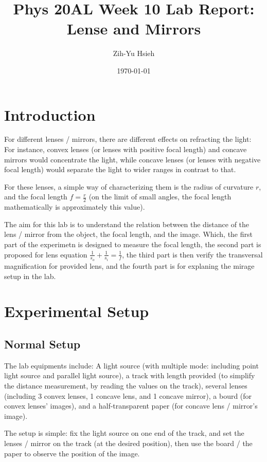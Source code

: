 \documentclass{article}
\title{Phys 20AL Week 10 Lab Report: Lense and Mirrors}
\author{Zih-Yu Hsieh}
\date{\today}
\begin{document}
\maketitle

\tableofcontents

\newpage

\section{Introduction}
For different lenses / mirrors, there are different effects on refracting the light: For instance, convex lenses (or lenses with positive focal length) and concave mirrors would concentrate the light, while concave lenses (or lenses with negative focal length) would separate the light to wider ranges in contrast to that.

For these lenses, a simple way of characterizing them is the radius of curvature $r$, and the focal length $f=\frac{r}{2}$ (on the limit of small angles, the focal length mathematically is approximately this value). 

The aim for this lab is to understand the relation between the distance of the lens / mirror from the object, the focal length, and the image. Which, the first part of the experimetn is designed to measure the focal length, the second part is proposed for lens equation $\frac{1}{s_o}+\frac{1}{s_i}=\frac{1}{f}$,  the third part is then verify the transversal magnification for provided lens, and the fourth part is for explaning the mirage setup in the lab.

\hfil

\hfil

\section{Experimental Setup}
\subsection{Normal Setup}
The lab equipments include: A light source (with multiple mode: including point light source and parallel light source), a track with length provided (to simplify the distance measurement, by reading the values on the track), several lenses (including 3 convex lenses, 1 concave lens, and 1 concave mirror), a bourd (for convex lenses' images), and a half-transparent paper (for concave lens / mirror's image).

The setup is simple: fix the light source on one end of the track, and set the lenses / mirror on the track (at the desired position), then use the board / the paper to observe the position of the image.
\end{document}
